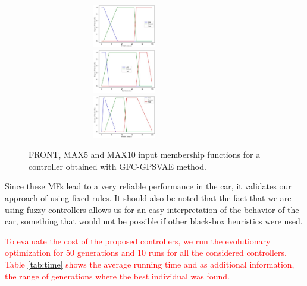 \documentclass[10pt,journal,compsoc]{IEEEtran}
\begin{document}
%
\begin{figure}[h]	
  \begin{center}
    \includegraphics[width=8.5cm, height=1.9cm]{fig/FRONT.jpg}
    \includegraphics[width=8.5cm, height=1.9cm]{fig/MAX5.jpg}
    \includegraphics[width=8.5cm, height=1.9cm]{fig/MAX10.jpg}		
    \caption{FRONT, MAX5 and MAX10 input membership functions for a controller obtained with {\sf GFC-GPSVAE} method.}
    \label{fig:frontmfs}
\end{center}	
\end{figure}
%
Since these MFs lead to a very reliable performance in the car, it
validates our approach of using fixed rules. It should
also be noted that the fact that we are using fuzzy controllers allows
us for an easy interpretation of the behavior of the car, something
that would not be possible if other black-box heuristics were used.

	\textcolor{red}{
To evaluate the cost of the proposed controllers, we run the evolutionary optimization for 50 generations and 10 runs for all the considered controllers.
 Table \ref{tab:time} shows the average running time and  as additional information, the range of generations where the best individual was found. } 
\end{document}
